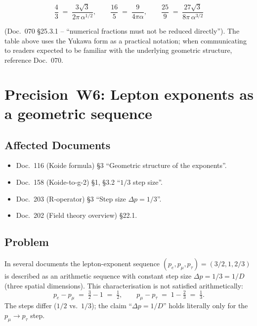 \begin{equation}
  \frac{4}{3} \;=\; \frac{3\sqrt{3}}{2\pi\,\alpha^{1/2}},
  \qquad
  \frac{16}{5} \;=\; \frac{9}{4\pi\alpha},
  \qquad
  \frac{25}{9} \;=\; \frac{27\sqrt{3}}{8\pi\,\alpha^{3/2}}
  \tag{210.8}
\end{equation}

(Doc.~070 §25.3.1 -- \enquote{numerical fractions must not be reduced
directly}). The table above uses the Yukawa form as a practical
notation; when communicating to readers expected to be familiar with
the underlying geometric structure, reference Doc.~070.

\section{\texorpdfstring{Precision~W6: Lepton exponents as a geometric sequence}{Precision W6: Lepton exponents as a geometric sequence}}

\subsection*{Affected Documents}

\begin{itemize}[leftmargin=2em,itemsep=2pt,topsep=2pt]
  \item Doc.~116 (Koide formula) §3 \enquote{Geometric structure of
        the exponents}.
  \item Doc.~158 (Koide-to-g-2) §1, §3.2 \enquote{$1/3$ step size}.
  \item Doc.~203 (R-operator) §3 \enquote{Step size $\Delta p = 1/3$}.
  \item Doc.~202 (Field theory overview) §22.1.
\end{itemize}

\subsection*{Problem}

In several documents the lepton-exponent sequence
$(p_e, p_\mu, p_\tau) = (3/2, 1, 2/3)$ is described as an arithmetic
sequence with constant step size $\Delta p = 1/3 = 1/D$ (three spatial
dimensions). This characterisation is not satisfied arithmetically:
\begin{equation}
  p_e - p_\mu \;=\; \tfrac{3}{2} - 1 \;=\; \tfrac{1}{2},
  \qquad
  p_\mu - p_\tau \;=\; 1 - \tfrac{2}{3} \;=\; \tfrac{1}{3}.
\end{equation}
The steps differ ($1/2$ vs.\ $1/3$); the claim
\enquote{$\Delta p = 1/D$} holds literally only for the
$p_\mu \to p_\tau$ step.

